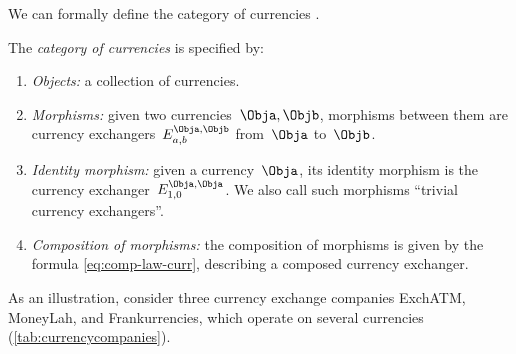
We can formally define the category of currencies \Curr.

\begin{definition}
    \label{def:Curr}
    The \emph{category of currencies} \Curr is specified by:
    \begin{enumerate}
        \item \emph{Objects:} a collection of currencies.
        \item \emph{Morphisms:} given two currencies~$\Obja, \Objb$, morphisms between them are currency exchangers~$E_{a,b}^{\Obja,\Objb}$ from~$\Obja$ to~$\Objb$.
        \item \emph{Identity morphism:} given a currency~$\Obja$, its identity morphism is the currency exchanger~$E_{1,0}^{\Obja,\Obja}$.
              We also call such morphisms ``trivial currency exchangers''.
        \item \emph{Composition of morphisms:} the composition of morphisms is given by the formula \cref{eq:comp-law-curr}, describing a composed currency exchanger.
    \end{enumerate}
\end{definition}

As an illustration, consider three currency exchange companies ExchATM, MoneyLah, and Frankurrencies, which operate on several currencies (\cref{tab:currencycompanies}).

